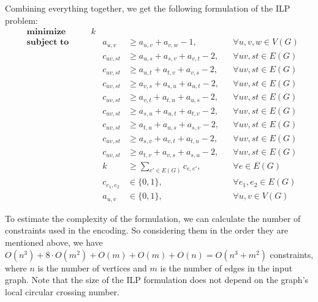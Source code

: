 Combining everything together, we get the following formulation of the ILP problem:
\begin{align}
    &\textbf{minimize}&\quad&k  \label{eq:ilp:objective}\\
    &\textbf{subject to}&\quad
    &&a_{u, v} &\geqslant a_{u, v} + a_{v, w} - 1,&&\forall u, v, w \in V(G)  \label{eq:ilp:con:transitivity}\\
    &&&&c_{uv, st} &\geqslant a_{u,s} + a_{s,v} + a_{v,t} - 2,&&\forall uv, st \in E(G)  \label{eq:ilp:con:cross-example}\\
    &&&&c_{uv, st} &\geqslant a_{u,t} + a_{t,v} + a_{v,s} - 2,&&\forall uv, st \in E(G) \label{eq:ilp:con:cross-begin}\\
    &&&&c_{uv, st} &\geqslant a_{v,s} + a_{s,u} + a_{u,t} - 2,&&\forall uv, st \in E(G)\\
    &&&&c_{uv, st} &\geqslant a_{v,t} + a_{t,u} + a_{u,s} - 2,&&\forall uv, st \in E(G)\\
    &&&&c_{uv, st} &\geqslant a_{s,u} + a_{u,t} + a_{t,v} - 2,&&\forall uv, st \in E(G)\\
    &&&&c_{uv, st} &\geqslant a_{t,u} + a_{u,s} + a_{s,v} - 2,&&\forall uv, st \in E(G)\\
    &&&&c_{uv, st} &\geqslant a_{s,v} + a_{v,t} + a_{t,u} - 2,&&\forall uv, st \in E(G)\\
    &&&&c_{uv, st} &\geqslant a_{t,v} + a_{v,s} + a_{s,u} - 2,&&\forall uv, st \in E(G)  \label{eq:ilp:con:cross-end}\\
    &&&&k &\geqslant \sum_{e' \in E(G)} c_{e, e'},&&\forall e \in E(G)  \label{eq:ilp:con:crossing-number}\\
    &&&&c_{e_1, e_2} &\in \{0, 1\},&&\forall e_1, e_2 \in E(G)  \label{eq:ilp:con:cross-var}\\
    &&&&a_{u, v} &\in \{0, 1\},&&\forall u, v \in V(G)  \label{eq:ilp:con:order-var}
\end{align}

To estimate the complexity of the formulation, we can calculate the number of constraints used in the encoding. So considering them in the order they are mentioned above, we have \(O(n^3) + 8\cdot O(m^2) + O(m) + O(m) + O(n) = O(n^3 + m^2)\) constraints, where \(n\) is the number of vertices and \(m\) is the number of edges in the input graph. Note that the size of the ILP formulation does not depend on the graph's local circular crossing number.

